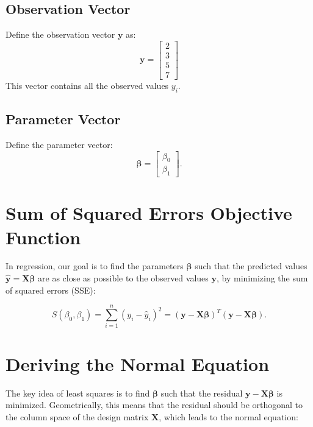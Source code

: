 \subsection{Observation Vector}

Define the observation vector $\mathbf{y}$ as:
\begin{equation}
    \mathbf{y} = \begin{bmatrix}
        2 \\
        3 \\
        5 \\
        7
    \end{bmatrix}
\end{equation}
This vector contains all the observed values $y_i$.

\subsection{Parameter Vector}

Define the parameter vector:
\begin{equation}
    \boldsymbol{\beta} = \begin{bmatrix} 
        \beta_0 \\ 
        \beta_1 
    \end{bmatrix}.
\end{equation}

\section{Sum of Squared Errors Objective Function}

In regression, our goal is to find the parameters $\boldsymbol{\beta}$ such that the predicted values $\hat{\mathbf{y}} = \mathbf{X} \boldsymbol{\beta}$ are as close as possible to the observed values $\mathbf{y}$, by minimizing the sum of squared errors (SSE):

\begin{equation}
    S(\beta_0, \beta_1) = \sum_{i=1}^n (y_i - \hat{y}_i)^2 = (\mathbf{y} - \mathbf{X} \boldsymbol{\beta})^T (\mathbf{y} - \mathbf{X} \boldsymbol{\beta}).
\end{equation}

\section{Deriving the Normal Equation}

The key idea of least squares is to find $\boldsymbol{\beta}$ such that the residual $\mathbf{y} - \mathbf{X} \boldsymbol{\beta}$ is minimized. Geometrically, this means that the residual should be orthogonal to the column space of the design matrix $\mathbf{X}$, which leads to the normal equation:

